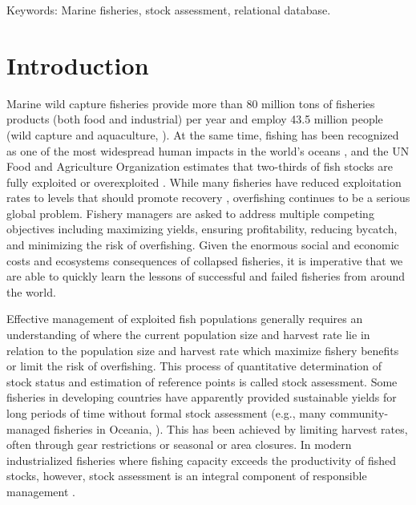 \documentclass[letterpaper,12pt]{article}
\begin{document}
\noindent Keywords: Marine fisheries, stock assessment, relational database.
\newpage
\section{Introduction}

Marine wild capture fisheries provide more than 80 million tons of
fisheries products (both food and industrial) per year and employ 43.5
million people (wild capture and aquaculture, \citet{FAO:fishstat}).  At the same
time, fishing has been recognized as one of the most widespread human
impacts in the world's oceans \citep{Halpern:etal:2008:science}, and
the UN Food and Agriculture Organization estimates that two-thirds of
fish stocks are fully exploited or overexploited \citep{FAO:fishstat}.  While
many fisheries have reduced exploitation rates to levels that should
promote recovery \citep{Worm:etal:2009:science}, overfishing continues
to be a serious global problem.  Fishery managers are asked to address
multiple competing objectives including maximizing yields, ensuring
profitability, reducing bycatch, and minimizing the risk of
overfishing.  Given the enormous social and economic costs
\citep{Rice:etal:2003:icescm} and ecosystems consequences
\citep{Frank:etal:2005:science, Myers:etal:2007:science} of collapsed
fisheries, it is imperative that we are able to quickly learn the
lessons of successful and failed fisheries from around the world.

Effective management of exploited fish populations generally requires
an understanding of where the current population size and harvest rate
lie in relation to the population size and harvest rate which maximize
fishery benefits or limit the risk of overfishing.  This process of
quantitative determination of stock status and estimation of reference
points is called stock assessment.  Some fisheries in developing
countries have apparently provided sustainable yields for long periods
of time without formal stock assessment (e.g., many community-managed
fisheries in Oceania, \citet{Johannes:2002:arees}).  This has been achieved by
limiting harvest rates, often through gear restrictions or seasonal or
area closures.  In modern industrialized fisheries where fishing
capacity exceeds the productivity of fished stocks, however, stock
assessment is an integral component of responsible
management \citep{Hilborn:Walters:1992}.
\end{document}
